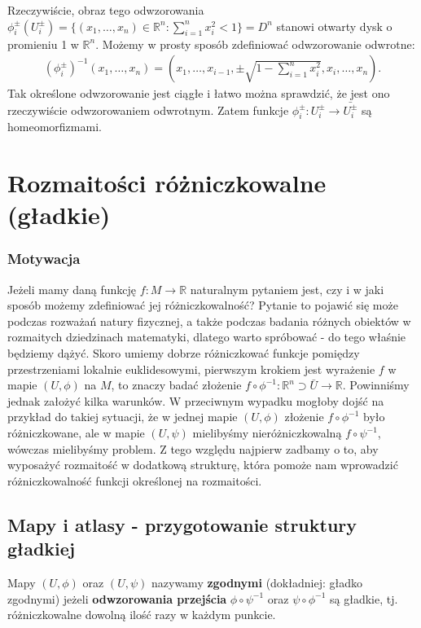 Rzeczywiście, obraz tego odwzorowania $\phi_i^{\pm}(U_i^{\pm}) = \{(x_1, \dots, x_n) \in \mathbb{R}^n : \sum_{i=1}^{n} x_i^2 < 1\} = D^n$ stanowi otwarty dysk o promieniu 1 w $\mathbb{R}^n$. Możemy w prosty sposób zdefiniować odwzorowanie odwrotne:
\begin{align*}
	\left(\phi_i^{\pm}\right)^{-1}(x_1, \dots, x_n) = \left(x_1, \dots, x_{i-1}, \pm \sqrt{1-\sum_{i=1}^{n} x_i^2}, x_{i}, \dots, x_n\right).
\end{align*}
Tak określone odwzorowanie jest ciągłe i łatwo można sprawdzić, że jest ono rzeczywiście odwzorowaniem odwrotnym. Zatem funkcje $\phi_{i}^{\pm} : U_{i}^{\pm} \to \bar{U_{i}^{\pm}}$ są homeomorfizmami.

\section{Rozmaitości różniczkowalne (gładkie)}
\subsubsection{Motywacja}
Jeżeli mamy daną funkcję $f : M \to \mathbb{R}$ naturalnym pytaniem jest, czy i w jaki sposób możemy zdefiniować jej różniczkowalność? Pytanie to pojawić się może podczas rozważań natury fizycznej, a także podczas badania różnych obiektów w rozmaitych dziedzinach matematyki, dlatego warto spróbować - do tego właśnie będziemy dążyć. Skoro umiemy dobrze różniczkować funkcje pomiędzy przestrzeniami lokalnie euklidesowymi, pierwszym krokiem jest wyrażenie $f$ w mapie $(U,\phi)$ na $M$, to znaczy badać złożenie $f\circ \phi^{-1} : \mathbb{R}^n \supset \bar{U} \to \mathbb{R}$. Powinniśmy jednak założyć kilka warunków. W przeciwnym wypadku mogłoby dojść na przykład do takiej sytuacji, że w jednej mapie $(U,\phi)$ złożenie $f \circ \phi^{-1}$ było różniczkowane, ale w mapie $(U,\psi)$ mielibyśmy nieróżniczkowalną $f \circ \psi^{-1}$, wówczas mielibyśmy problem. Z tego względu najpierw zadbamy o to, aby wyposażyć rozmaitość w dodatkową strukturę, która pomoże nam wprowadzić różniczkowalność funkcji określonej na rozmaitości.

\subsection{Mapy i atlasy - przygotowanie struktury gładkiej}
\begin{definition}
	Mapy $(U,\phi)$ oraz $(U,\psi)$ nazywamy \textbf{zgodnymi} (dokładniej: gładko zgodnymi) jeżeli \textbf{odwzorowania przejścia} $\phi \circ \psi^{-1}$ oraz $\psi \circ \phi^{-1}$ są gładkie, tj. różniczkowalne dowolną ilość razy w każdym punkcie.
\end{definition}

